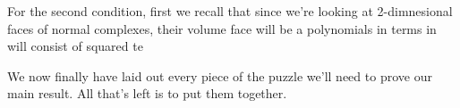 \documentclass[12pt,oneside]{../../sfsuthesis}
\begin{document}
For the second condition, first we recall that since we're looking at 2-dimnesional faces of normal complexes, their volume face will be a polynomials in terms  in will consist of squared te

We now finally have laid out every piece of the puzzle we'll need to prove our main result.
All that's left is to put them together.
\end{document}
